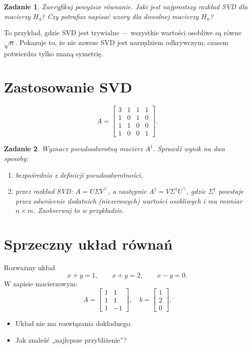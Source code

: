 \documentclass[12pt]{article}
\newtheorem{zadanie}{Zadanie}[section]
\begin{document}
\begin{zadanie}
Zweryfikuj powyższe równanie.
Jaki jest najprostszy rozkład SVD dla macierzy $H_4$?
Czy potrafisz napisać wzory dla dowolnej macierzy \(H_n\)?
\end{zadanie}

To przykład, gdzie SVD jest trywialne — wszystkie wartości osobliwe są równe 
$\sqrt{n}$. Pokazuje to, że nie zawsze SVD jest narzędziem odkrywczym; czasem potwierdza tylko znaną symetrię.

\section{ Zastosowanie SVD} 
\[
A = \begin{bmatrix}
  3 &  1 &  1 &  1 \\
  1 & 0 &  1 & 0 \\
  1 &  1 & 0 & 0 \\
  1 & 0 & 0 &  1
\end{bmatrix}.
\]
\begin{zadanie}
Wyznacz pseudoodwrotną macierz \(A^\dagger\).  
Sprawdź wynik na dwa sposoby:
\begin{enumerate}
  \item bezpośrednio z definicji pseudoodwrotności,
  \item przez rozkład SVD: $A = U\Sigma V^\top$, a następnie
$A^\dagger = V\Sigma^\dagger U^\top$, 
gdzie $\Sigma^\dagger$ powstaje przez odwrócenie dodatnich 
(niezerowych) wartości osobliwych i ma rozmiar $n\times m$. Zaobserwuj to w przykładzie.
\end{enumerate}
\end{zadanie}

\medskip

\section{ Sprzeczny układ równań}
Rozważmy układ
\[
x+y=1,\qquad x+y=2,\qquad x-y=0.
\]
W zapisie macierzowym:
\[
A=\begin{bmatrix}1 & 1 \\ 1 & 1 \\ 1 & -1\end{bmatrix}, \quad
b=\begin{bmatrix}1 \\ 2 \\ 0\end{bmatrix}.
\]

\begin{itemize}
  \item Układ nie ma rozwiązania dokładnego.
  \item Jak znaleźć „najlepsze przybliżenie”?
\end{itemize}
\end{document}
